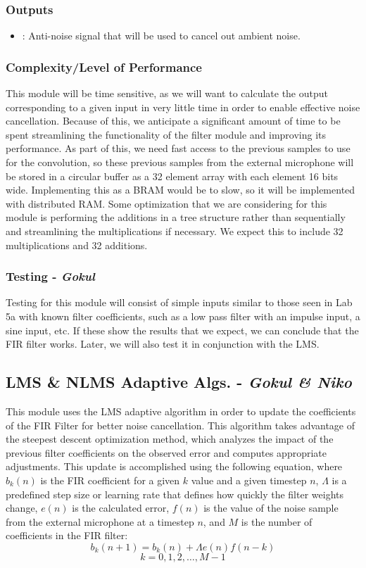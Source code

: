 \documentclass{fpgairpods}
\begin{document}
\subsubsection{Outputs}
\begin{itemize}
    \item {}: Anti-noise signal that will be used to cancel out ambient noise.
\end{itemize}
\subsubsection{Complexity/Level of Performance}
This module will be time sensitive, as we will want to calculate the output corresponding to a given input in very little time in order to enable effective noise cancellation. Because of this, we anticipate a significant amount of time to be spent streamlining the functionality of the filter module and improving its performance. As part of this, we need fast access to the previous samples to use for the convolution, so these previous samples from the external microphone will be stored in a circular buffer as a 32 element array with each element 16 bits wide. Implementing this as a BRAM would be to slow, so it will be implemented with distributed RAM. Some optimization that we are considering for this module is performing the additions in a tree structure rather than sequentially and streamlining the multiplications if necessary. We expect this to include 32 multiplications and 32 additions.

\subsubsection{Testing - \textit{Gokul}}
Testing for this module will consist of simple inputs similar to those seen in Lab 5a with known filter coefficients, such as a low pass filter with an impulse input, a sine input, etc. If these show the results that we expect, we can conclude that the FIR filter works. Later, we will also test it in conjunction with the LMS.

\subsection{LMS \& NLMS Adaptive Algs. - \textit{Gokul \& Niko}}
This module uses the LMS adaptive algorithm in order to update the coefficients of the FIR Filter for better noise cancellation. This algorithm takes advantage of the steepest descent optimization method, which analyzes the impact of the previous filter coefficients on the observed error and computes appropriate adjustments. This update is accomplished using the following equation\cite{lmsfilter}, where $b_k(n)$ is the FIR coefficient for a given $k$ value and a given timestep $n$, $\Lambda$ is a predefined step size or learning rate that defines how quickly the filter weights change, $e(n)$ is the calculated error, $f(n)$ is the value of the noise sample from the external microphone at a timestep $n$, and $M$ is the number of coefficients in the FIR filter:
\[ b_k(n + 1) = b_k(n) + \Lambda e(n)f(n-k) \]
\[ k = 0, 1, 2,\ldots,  M-1 \]
\end{document}
